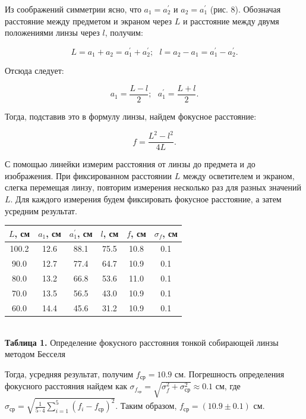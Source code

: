 \documentclass[a4paper,12pt]{article} %
\begin{document}
\hfill \break Из соображений симметрии ясно, что $a_{1} = a_{2}^\prime$ и $a_{2} = a_{1}^\prime$ (рис. 8). Обозначая расстояние между предметом и экраном через $L$ и расстояние между двумя положениями линзы через $l$, получим: 

\begin{equation}\label{ linkname }
L = a_{1} + a_{2} = a_{1}^\prime + a_{2}^\prime; \text{ } l = a_{2} - a_{1} = a_{1}^\prime - a_{2}^\prime.
\end{equation}

\hfill \break Отсюда следует:

$$
a_{1} = \frac{L - l} {2}; \text{ } a_{1}^\prime = \frac {L + l} {2}.
$$

\hfill \break
\hfill \break Тогда, подставив это в формулу линзы, найдем фокусное расстояние:

\begin{equation}\label{ linkname }
f = \frac {L^2 - l^2} {4L}.
\end{equation}

\hfill \break С помощью линейки измерим расстояния от линзы до предмета и до изображения. При фиксированном расстоянии $L$ между осветителем и экраном, слегка перемещая линзу, повторим измерения несколько раз для разных значений $L$. Для каждого измерения будем фиксировать фокусное расстояние, а затем усредним результат. 

\begin{center}
\begin{tabular}{|c|c|c|c|c|c|}\hline
$ L $, см & $ a_{1} $, см & $ a_{1}^\prime $, см & $ l $, см & $ f $, см & $ \sigma_f $, см \\\hline
100.2 & 12.6 & 88.1 & 75.5 & 10.8 & 0.1 \\\hline
90.0 & 12.7 & 77.4 & 64.7 & 10.9 & 0.1 \\\hline
80.0 & 13.2 & 66.8 & 53.6 & 11.0 & 0.1 \\\hline
70.0 & 13.5 & 56.5 & 43.0 & 10.9 & 0.1 \\\hline
60.0 & 14.4 & 45.6 & 31.2 & 10.9 & 0.1 \\\hline
\end{tabular} \\
\hfill \break \textbf {Таблица 1.} Определение фокусного расстояния тонкой собирающей линзы методом Бесселя\\
\end{center}

\hfill \break Тогда, усредняя результат, получим $f_{\text{ср}} = 10.9$ см. Погрешность определения фокусного расстояния найдем как $\sigma_{f_{\text{ср}}} = \sqrt{ \sigma_{f}^2 + \sigma_{\text{ср}}^2} \approx 0.1$ см, где $\sigma_{\text{ср}} = \sqrt{ \frac{1} {5 \cdot 4} \sum\limits_{i = 1}^5 (f_{i} - f_{\text{ср}})^2 }$. Таким образом, $f_{\text{ср}} = (10.9 \pm 0.1)$ см.
\end{document}
